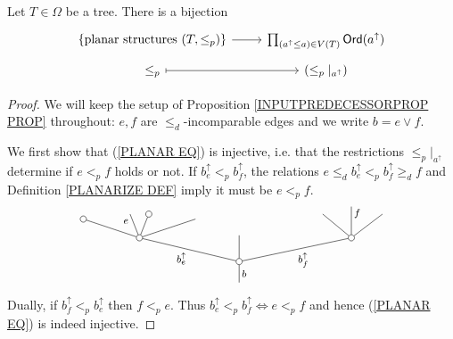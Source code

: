 \documentclass[a4paper,10pt]{article}%
\begin{document}
\begin{proposition}\label{PLANARIZATIONCHAR PROP}
	Let $T \in \Omega$ be a tree. There is a bijection
	\begin{equation}\label{PLANAR EQ}
	\begin{tikzcd}[row sep = 0.5em]
		\{\text{planar structures }(T,\leq_p)\} \ar[r] &
		\prod_{(a^{\uparrow} \leq a) \in V(T)} \mathsf{Ord}(a^{\uparrow}) \\
		\leq_p \ar[mapsto]{r} & (\leq_p|_{a^{\uparrow}})
	\end{tikzcd}	
	\end{equation}
\end{proposition}


\begin{proof}
We will keep the setup of Proposition \ref{INPUTPREDECESSORPROP PROP} throughout: $e, f$ are $\leq_d$-incomparable edges and we write $b = e \vee f$. 

	We first show that (\ref{PLANAR EQ}) is injective, i.e. that the restrictions $\leq_p|_{a^{\uparrow}}$ determine if 
	$e <_p f$ holds or not.
If $b^{\uparrow}_e <_p b^{\uparrow}_f$, the relations
$e \leq_d b^{\uparrow}_e <_p b^{\uparrow}_f \geq_d f$
and Definition \ref{PLANARIZE DEF} imply it must be $e <_p f$.
\[
	\begin{tikzpicture}[grow=up,auto,level distance=1.9em,
	every node/.style = {font=\footnotesize,inner sep=2pt},
	dummy/.style={circle,draw,inner sep=0pt,minimum size=1.75mm}]
		\node at (0,0) {}
			child{node [dummy] {}
				child[sibling distance = 9em]{node [dummy] {}
					child[sibling distance = 2.5em]{
					edge from parent node [near end,swap] {}}
					child[level distance=2.5em]{
					edge from parent node [near end,swap] {$f$}}				
					child[sibling distance = 2.3em]{
					edge from parent node [near end] {}}
				edge from parent node [swap] {$b^{\uparrow}_{f}$}}
				child[level distance =2.1em]{
				edge from parent node [swap] {}}
				child[sibling distance = 8em]{node [dummy] {}
					child[sibling distance =3em, level distance = 1.5 em]{
					edge from parent node [swap] {}}
					child[sibling distance = 1.5em]{node [dummy] {}
					edge from parent node [very near end,swap] {}}
					child[sibling distance =1.5em]{
					edge from parent node [very near end] {$e$}}
					child[sibling distance =3em,level distance =1.5em]{node [dummy] {}
					edge from parent node {}}
				edge from parent node {$b^{\uparrow}_e$}}
			edge from parent node [swap] {$b$}};
	\end{tikzpicture}
\]
Dually, if $b^{\uparrow}_f <_p b^{\uparrow}_e$ then 
$f <_p e$. Thus 
$b^{\uparrow}_e <_p b^{\uparrow}_f \Leftrightarrow e <_p f$ and hence (\ref{PLANAR EQ}) is indeed injective.


\end{proof}
\end{document}
